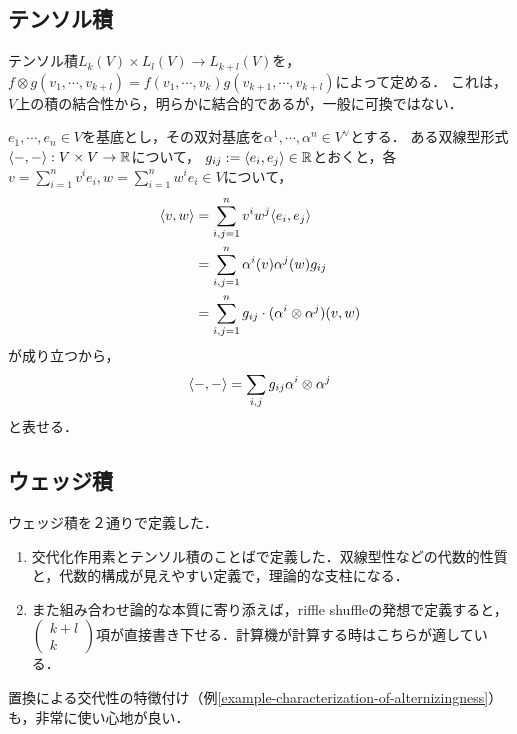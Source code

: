 \documentclass[uplatex,dvipdfmx]{jsreport}
\begin{document}
\subsection{テンソル積}

\begin{definition}
    テンソル積$L_k(V)\times L_l(V)\to L_{k+l}(V)$を，$f\otimes g(v_1,\cdots,v_{k+l})=f(v_1,\cdots,v_k)g(v_{k+1},\cdots,v_{k+l})$によって定める．
    これは，$V$上の積の結合性から，明らかに結合的であるが，一般に可換ではない．
\end{definition}

\begin{example}[双線型形式のテンソル積による表現]
    $e_1,\cdots,e_n\in V$を基底とし，その双対基底を$\alpha^1,\cdots,\alpha^n\in V^\vee$とする．
    ある双線型形式$\langle-,-\rangle:V\times V\to\mathbb{R}$について，
    $g_{ij}:=\langle e_i,e_j\rangle\in\mathbb{R}$とおくと，各$v=\sum^n_{i=1}v^ie_i,w=\sum^n_{i=1}w^ie_i\in V$について，
    \begin{align*}
        \langle v,w\rangle&=\sum_{i,j=1}^nv^iw^j\langle e_i,e_j\rangle\\
        &=\sum_{i,j=1}^n\alpha^i(v)\alpha^j(w)g_{ij}\\
        &=\sum_{i,j=1}^ng_{ij}\cdot(\alpha^i\otimes\alpha^j)(v,w)
    \end{align*}
    が成り立つから，
    \[\langle-,-\rangle=\sum_{i,j}g_{ij}\alpha^i\otimes\alpha^j\]
    と表せる．
\end{example}

\subsection{ウェッジ積}

\begin{tcolorbox}[colframe=ForestGreen, colback=ForestGreen!10!white, breakable ,colbacktitle=ForestGreen!40!white, coltitle=black,fonttitle=\bfseries\sffamily,
    title=ウェッジ積の定義]
    ウェッジ積を２通りで定義した．
    \begin{enumerate}
        \item 交代化作用素とテンソル積のことばで定義した．双線型性などの代数的性質と，代数的構成が見えやすい定義で，理論的な支柱になる．
        \item また組み合わせ論的な本質に寄り添えば，riffle shuffleの発想で定義すると，$\begin{pmatrix}k+l\\k\end{pmatrix}$項が直接書き下せる．計算機が計算する時はこちらが適している．
    \end{enumerate}
    置換による交代性の特徴付け（例\ref{example-characterization-of-alternizingness}）も，非常に使い心地が良い．
\end{tcolorbox}
\end{document}
